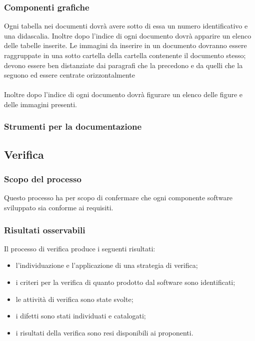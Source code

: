 \documentclass[a4paper,11pt]{article}
\begin{document}
			\subsubsection{Componenti grafiche}
				Ogni tabella nei documenti dovrà avere sotto di essa un numero identificativo e una didascalia. Inoltre dopo l'indice di ogni documento dovrà apparire un elenco delle tabelle inserite.
					Le immagini da inserire in un documento dovranno essere raggruppate in una sotto cartella della cartella contenente il documento stesso; devono essere ben distanziate dai paragrafi che la precedono e da quelli che la seguono ed essere centrate orizzontalmente \\ \\ 
					 Inoltre dopo l'indice di ogni documento dovrà figurare un elenco delle figure e delle immagini presenti.
					 
			\subsubsection{Strumenti per la documentazione}
				
			\subsection{Verifica}
				\subsubsection{Scopo del processo}
					Questo processo ha per scopo di confermare che ogni componente software sviluppato sia conforme ai requisiti.		
				\subsubsection{Risultati osservabili}
				Il processo di verifica produce i seguenti risultati:
				\begin{itemize}
					\item l'individuazione e l'applicazione di una strategia di verifica;
					\item i criteri per la verifica di quanto prodotto dal software sono identificati;
					\item le attività di verifica sono state svolte;
					\item i difetti sono stati individuati e catalogati;
					\item i risultati della verifica sono resi disponibili ai proponenti.
				\end{itemize}
				
\end{document}
